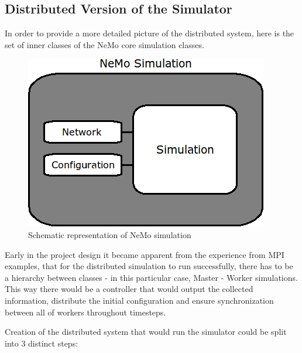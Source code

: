 \subsection{Distributed Version of the Simulator}

In order to provide a more detailed picture of the distributed system, here is the set of inner classes of the NeMo core simulation classes.

\begin{figure}[h!]
\begin{center}
\includegraphics[scale = 0.6]{images/nemo_simulation_schematic.png}
\end{center}
\caption{Schematic representation of NeMo simulation}
\end{figure}

Early in the project design it became apparent from the experience from MPI examples\cite{}, that for the distributed simulation to run successfully, there has to be a hierarchy between classes - in this particular case, Master - Worker simulations. This way there would be a controller that would output the collected information, distribute the initial configuration and ensure synchronization between all of workers throughout timesteps.

Creation of the distributed system that would run the simulator could be split into 3 distinct steps:

